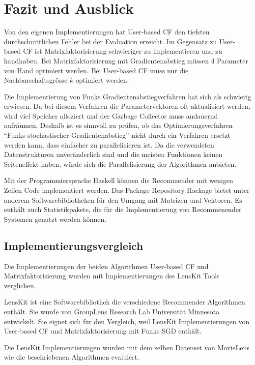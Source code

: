 \documentclass[a4paper, 12pt]{article}
\begin{document}
\section{Fazit und Ausblick}
\label{sec:fazit}

Von den eigenen Implementierungen hat User-based CF den tiefsten durchschnittlichen Fehler bei der Evaluation erreicht. Im Gegensatz zu User-based CF ist Matrixfaktorisierung schwieriger zu implementieren und zu handhaben. Bei Matrixfaktorisierung mit Gradientenabstieg müssen 4 Parameter von Hand optimiert werden. Bei User-based CF muss nur die Nachbarschaftsgrösse $k$ optimiert werden.

Die Implementierung von Funks Gradientenabstiegverfahren hat sich als schwierig erwiesen. Da bei diesem Verfahren die Parametervektoren oft aktualisiert werden, wird viel Speicher alloziert und der Garbage Collector muss andauernd aufräumen. Deshalb ist es sinnvoll zu prüfen, ob das Optimierungsverfahren "`Funks stochastischer Gradientenabstieg"' nicht durch ein Verfahren ersetzt werden kann, dass einfacher zu parallelisieren ist. Da die verwendeten Datenstrukturen unveränderlich sind und die meisten Funktionen keinen Seiteneffekt haben, würde sich die Parallelisierung der Algorithmen anbieten.

Mit der Programmiersprache Haskell können die Recommender mit wenigen Zeilen Code implementiert werden. Das Package Repository Hackage bietet unter anderem Softwarebibliotheken für den Umgang mit Matrizen und Vektoren. Es enthält auch Statistikpakete, die für die Implementierung von Recommenender Systemen genutzt werden können.

\subsection{Implementierungsvergleich}
\label{sec:compare}

Die Implementierungen der beiden Algorithmen User-based CF und Matrixfaktorisierung wurden mit Implementierungen des LensKit Tools verglichen. 

LensKit ist eine Softwarebibliothek die verschiedene Recommender Algorithmen enthält. Sie wurde von GroupLens Research Lab Universität Minnesota \cite{ekstrandlk11} entwickelt. Sie eignet sich für den Vergleich, weil LensKit Implementierungen von User-based CF und Matrixfaktorisierung mit Funks SGD enthält.

Die LensKit Implementierungen wurden mit dem selben Datenset von MovieLens wie die beschriebenen Algorithmen evaluiert.
\end{document}
